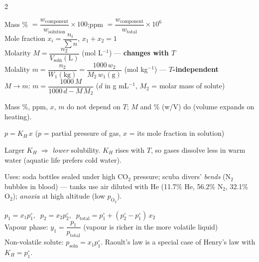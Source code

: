 \documentclass[9pt,a4paper]{extarticle}
\begin{document}
\begin{multicols}{2}\raggedcolumns
\begin{kbox}
Mass \% $=\dfrac{w_\text{component}}{w_\text{solution}}\times100$;\quad ppm $=\dfrac{w_\text{component}}{w_\text{total}}\times10^6$\\[1pt]
Mole fraction $x_i=\dfrac{n_i}{\sum n}$, \;$x_1+x_2=1$\\[1pt]
Molarity $M=\dfrac{n_2}{V_\text{soln}(\text{L})}$ (mol L$^{-1}$) — \textbf{changes with $T$}\\[1pt]
Molality $m=\dfrac{n_2}{W_1(\text{kg})}=\dfrac{1000\,w_2}{M_2\,w_1(\text{g})}$ (mol kg$^{-1}$) — \textbf{$T$-independent}\\[1pt]
$M\to m$: \;$m=\dfrac{1000\,M}{1000\,d-M\,M_2}$ \;($d$ in g mL$^{-1}$, $M_2$ = molar mass of solute)
\end{kbox}
\begin{fl}
\item Mass \%, ppm, $x$, $m$ do not depend on $T$; $M$ and \% (w/V) do (volume expands on heating).
\end{fl}
\begin{kbox}
$p=K_H\,x$ \quad ($p$ = partial pressure of gas, $x$ = its mole fraction in solution)
\end{kbox}
\begin{fl}
\item Larger $K_H$ $\Rightarrow$ \emph{lower} solubility. $K_H$ rises with $T$, so gases dissolve less in warm water (aquatic life prefers cold water). \SQP
\item Uses: soda bottles sealed under high CO$_2$ pressure; scuba divers' \emph{bends} (N$_2$ bubbles in blood) — tanks use air diluted with He (11.7\% He, 56.2\% N$_2$, 32.1\% O$_2$); \emph{anoxia} at high altitude (low $p_{\mathrm{O_2}}$).
\end{fl}
\begin{kbox}
$p_1=x_1p_1^\circ,\;\; p_2=x_2p_2^\circ,\;\; p_\text{total}=p_1^\circ+(p_2^\circ-p_1^\circ)\,x_2$\\[1pt]
Vapour phase: $y_1=\dfrac{p_1}{p_\text{total}}$ \;(vapour is richer in the more volatile liquid)\\[1pt]
Non-volatile solute: $p_\text{soln}=x_1p_1^\circ$. \;Raoult's law is a special case of Henry's law with $K_H=p_1^\circ$.
\end{kbox}

\end{multicols}
\end{document}
